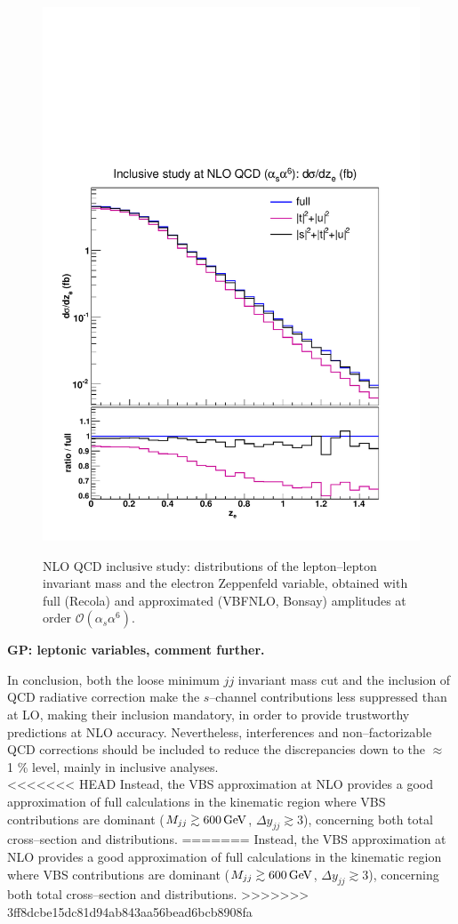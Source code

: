 \begin{figure}[hbt]
{\includegraphics[scale=0.35]{figures/scanfigures/zel_nlo.pdf}}
\caption{NLO QCD inclusive study: distributions of the lepton--lepton invariant mass and the electron Zeppenfeld variable, obtained with full ({\sc Recola}) and approximated ({\sc VBFNLO, Bonsay}) amplitudes at order $\mathcal{O}(\alpha_s\alpha^6)$.} \label{fig:mjjdyjj_1d_3}
\end{figure}
{\bf GP: leptonic variables, comment further.}


In conclusion, both the loose minimum $jj$ invariant mass cut and the inclusion of QCD radiative correction make the $s$--channel contributions less suppressed than at LO, making their inclusion mandatory, in order to provide trustworthy predictions at NLO accuracy. Nevertheless, interferences and non--factorizable QCD corrections should be included to reduce the discrepancies down to the $\approx$ 1 \%  level, mainly in inclusive analyses.\\
<<<<<<< HEAD
Instead, the VBS approximation at NLO provides a good approximation of full calculations in the kinematic region where VBS contributions are dominant ($M_{jj} \gtrsim 600 \,\text{GeV}$, $\Delta y_{jj} \gtrsim 3$), concerning both total cross--section and distributions. 
=======
Instead, the VBS approximation at NLO provides a good approximation of full calculations in the kinematic region where VBS contributions are dominant ($M_{jj} \gtrsim 600 \,\text{GeV}$, $\Delta y_{jj} \gtrsim 3$), concerning both total cross--section and distributions.
>>>>>>> 3ff8dcbe15dc81d94ab843aa56bead6bcb8908fa
